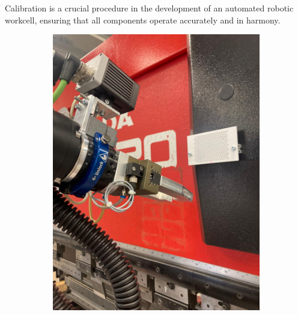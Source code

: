 
Calibration is a crucial procedure in the development of 
an automated robotic workcell, ensuring that all components
operate accurately and in harmony.

    
\begin{figure}[h]
    \centering
    \begin{subfigure}{0.48\textwidth}
        \centering
        \includegraphics[width=\textwidth, angle=0]{figures/001calibration/calibration-process-left.jpeg} %
        \label{fig:calibration-process-left}
    \end{subfigure}\hspace{0cm}
    \begin{subfigure}{0.48\textwidth}
        \centering

\end{subfigure}
\end{figure}
